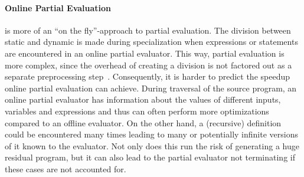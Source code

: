 \paragraph{Online Partial Evaluation}
is more of an \enquote{on the fly}-approach to partial evaluation.
The division between static and dynamic is made during specialization when expressions or statements are encountered in an online partial evaluator.
This way, partial evaluation is more complex, since the overhead of creating a division is not factored out as a separate preprocessing step~\cite{Cook_TutorialOnlinePartialEvaluation}.
Consequently, it is harder to predict the speedup online partial evaluation can achieve.
During traversal of the source program, an online partial evaluator has information about the values of different inputs, variables and expressions and thus can often perform more optimizations compared to an offline evaluator.
On the other hand, a (recursive) definition could be encountered many times leading to many or potentially infinite versions of it known to the evaluator.
Not only does this run the risk of generating a huge residual program, but it can also lead to the partial evaluator not terminating if these cases are not accounted for.


